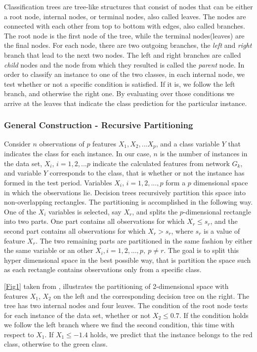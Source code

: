 \documentclass{acm_proc_article-sp}
\begin{document}
Classification trees are tree-like structures that consist of nodes that can be either a root node, internal nodes, or terminal nodes, also called leaves. The nodes are connected with each other from top to bottom with edges, also called branches. The root node is the first node of the tree, while the terminal nodes(leaves) are the final nodes. For each node, there are two outgoing branches, the \textit{left} and \textit{right} branch that lead to the next two nodes. The left and right branches are called \textit{child} nodes and the node from which they resulted is called the \textit{parent} node. In order to classify an instance to one of the two classes, in each internal node, we test whether or not a specific condition is satisfied. If it is, we follow the left branch, and otherwise the right one. By evaluating over those conditions we arrive at the leaves that indicate the class prediction for the particular instance. 

\subsubsection{General Construction - Recursive Partitioning}

Consider $n$ observations of $p$ features $X_1, X_2,...X_p$, and a class variable $Y$ that indicates the class for each instance. In our case, $n$ is the number of instances in the data set, $X_i$, $i = 1,2,...p$ indicate the calculated features from network $G_k$, and variable $Y$ corresponds to the class, that is whether or not the instance has formed in the test period. Variables $X_i$, $i = 1,2,...,p$ form a $p$ dimensional space in which the observations lie. Decision trees recursively partition this space into non-overlapping rectangles. The partitioning is accomplished in the following way. One of the $X_i$ variables is selected, say $X_r$, and splits the $p$-dimensional rectangle into two parts. One part contains all observations for which $X_r \leqslant s_r$, and the second part contains all observations for which $X_r > s_r$, where $s_r$ is a value of feature $X_r$. The two remaining parts are partitioned in the same fashion by either the same variable or an other $X_i, i = 1,2,..., p,\ p\neq r$. The goal is to split this hyper dimensional space in the best possible way, that is partition the space such as each rectangle contains observations only from a specific class. 

\autoref{Fig1} taken from \cite{WIDM:WIDM8}, illustrates the partitioning of 2-dimensional space with features $X_1$, $X_2$ on the left and the corresponding decision tree on the right. The tree has two internal nodes and four leaves. The condition of the root node tests for each instance of the data set, whether or not $X_2 \leqslant 0.7$. If the condition holds we follow the left branch where we find the second condition, this time with respect to $X_1$. If $X_1 \leqslant -1.4$ holds, we predict that the instance belongs to the red class, otherwise to the green class.
\end{document}
